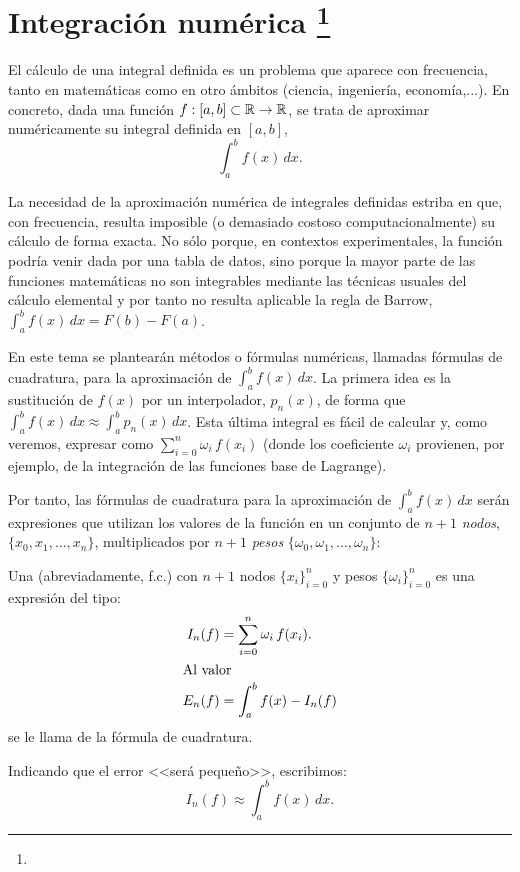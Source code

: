 \chapter[Integración numérica]{Integración numérica%
\footnote{\licenseInfo}}
\label{cha:integracion-numerica}

El cálculo de una integral definida es un problema que aparece con
frecuencia, tanto en matemáticas como en otro ámbitos (ciencia,
ingeniería, economía,...). En concreto, dada una función
$f:[a,b]\subset\operatorname{{\mathbb R}}\to\operatorname{{\mathbb R}}$, se trata de aproximar numéricamente su
integral definida en $[a,b]$,
\begin{equation*}
  \int_a^bf(x)\,dx.
\end{equation*}

La necesidad de la aproximación numérica de integrales definidas
estriba en que, con frecuencia, resulta imposible (o demasiado costoso
computacionalmente) su cálculo de forma exacta. No sólo porque, en
contextos experimentales, la función podría venir dada por una tabla
de datos, sino porque la mayor parte de las funciones matemáticas no
son integrables mediante las técnicas usuales del cálculo elemental
y por tanto no resulta aplicable la regla de Barrow, $\int_a^b f(x)\,
dx=F(b)-F(a)$.

En este tema se plantearán métodos o fórmulas numéricas, llamadas
fórmulas de cuadratura, para la aproximación de $\int_a^b f(x)\,
dx$. La primera idea es la sustitución de $f(x)$ por un interpolador,
$p_n(x)$, de forma que $\int_a^bf(x)\,dx \approx \int_a^b p_n(x)\,
dx$. Esta última integral es fácil de calcular y, como veremos,
expresar como $\sum_{i=0}^n \omega_i \, f(x_i)$ (donde los coeficiente
$\omega_i$ provienen, por ejemplo, de la integración de las
funciones base de Lagrange).


Por tanto, las fórmulas de cuadratura para la aproximación de
$\int_a^b f(x)\, dx$ serán expresiones que utilizan los valores de la
función en un conjunto de $n+1$ \emph{nodos}, $\{x_0,x_1,\dots,x_n\}$,
multiplicados por $n+1$ \emph{pesos}
$\{\omega_0,\omega_1,\dots,\omega_n\}$:
\begin{definition}
  \label{def:formula-cuadratura}
  Una  (abreviadamente, f.c.) con
  $n+1$ nodos $\{x_i\}_{i=0}^n$ y pesos $\{\omega_i\}_{i=0}^n$ es una
  expresión del tipo:
  \begin{align}
    \label{eq:f.cuadratura}
    I_n(f)&=\sum_{i=0}^n \omega_i \, f(x_i).
    \\
    \intertext{Al valor}
    \notag
    E_n(f) &= \int_a^b f(x) - I_n(f) 
  \end{align}
  se le llama  de la fórmula de cuadratura. 
\end{definition}
Indicando que el error <<será pequeño>>, escribimos:
\begin{equation*}
  I_n(f) \approx \int_a^b f(x)\, dx.
\end{equation*}

